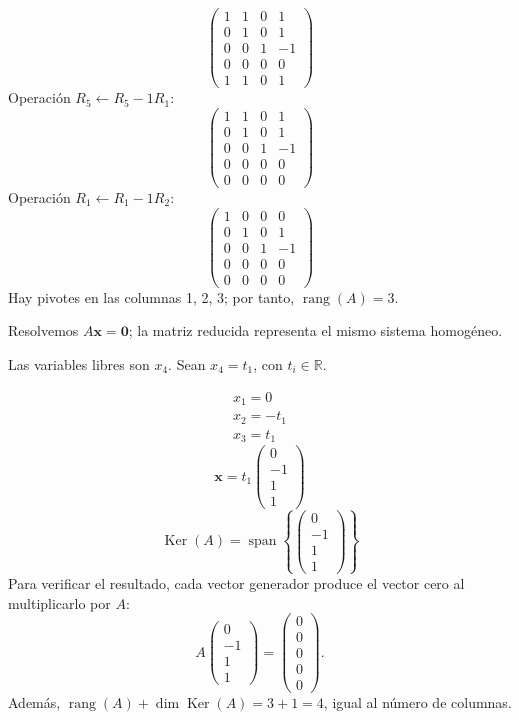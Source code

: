 \documentclass[12pt]{article}
\newcommand{\rang}{\operatorname{rang}}
\newcommand{\Ker}{\operatorname{Ker}}
\newcommand{\vect}[1]{\boldsymbol{#1}}
\begin{document}
\[
\begin{pmatrix}1&1&0&1\\0&1&0&1\\0&0&1&-1\\0&0&0&0\\1&1&0&1\end{pmatrix}
\]
Operación $R_{5}\leftarrow R_{5}-1R_{1}$:
\[
\begin{pmatrix}1&1&0&1\\0&1&0&1\\0&0&1&-1\\0&0&0&0\\0&0&0&0\end{pmatrix}
\]
Operación $R_{1}\leftarrow R_{1}-1R_{2}$:
\[
\begin{pmatrix}1&0&0&0\\0&1&0&1\\0&0&1&-1\\0&0&0&0\\0&0&0&0\end{pmatrix}
\]
Hay pivotes en las columnas 1, 2, 3; por tanto, $\boxed{\rang(A)=3}$.

Resolvemos $A\vect x=\vect0$; la matriz reducida representa el mismo sistema homogéneo.

Las variables libres son $x_{4}$. Sean $x_{4}=t_{1}$, con $t_i\in\mathbb R$.

\[
\begin{aligned}x_{1}=0\\x_{2}=- t_{1}\\x_{3}=t_{1}\end{aligned}
\]
\[
\vect x=t_{1}\begin{pmatrix}0\\-1\\1\\1\end{pmatrix}
\]
\[
\boxed{\Ker(A)=\operatorname{span}\left\{\begin{pmatrix}0\\-1\\1\\1\end{pmatrix}\right\}}
\]
Para verificar el resultado, cada vector generador produce el vector cero al multiplicarlo por $A$:
\[
A\begin{pmatrix}0\\-1\\1\\1\end{pmatrix}=\begin{pmatrix}0\\0\\0\\0\\0\end{pmatrix}.
\]
Además, $\rang(A)+\dim\Ker(A)=3+1=4$, igual al número de columnas.
\end{document}
